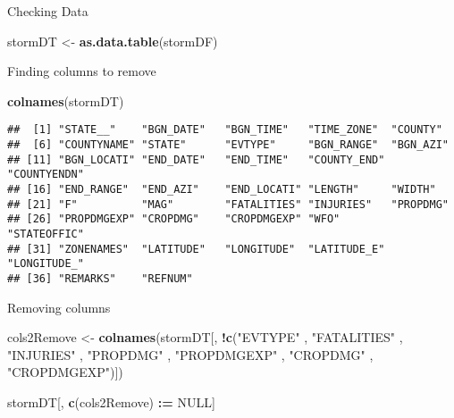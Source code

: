 \documentclass[]{article}
\newenvironment{Shaded}{\begin{snugshade}}{\end{snugshade}}
\newcommand{\ErrorTok}[1]{\textcolor[rgb]{0.64,0.00,0.00}{\textbf{#1}}}
\newcommand{\KeywordTok}[1]{\textcolor[rgb]{0.13,0.29,0.53}{\textbf{#1}}}
\newcommand{\NormalTok}[1]{#1}
\newcommand{\OperatorTok}[1]{\textcolor[rgb]{0.81,0.36,0.00}{\textbf{#1}}}
\newcommand{\OtherTok}[1]{\textcolor[rgb]{0.56,0.35,0.01}{#1}}
\newcommand{\StringTok}[1]{\textcolor[rgb]{0.31,0.60,0.02}{#1}}
\begin{document}
Checking Data

\begin{Shaded}
\begin{Highlighting}[]
\NormalTok{stormDT <-}\StringTok{ }\KeywordTok{as.data.table}\NormalTok{(stormDF)}
\end{Highlighting}
\end{Shaded}

Finding columns to remove

\begin{Shaded}
\begin{Highlighting}[]
\KeywordTok{colnames}\NormalTok{(stormDT)}
\end{Highlighting}
\end{Shaded}

\begin{verbatim}
##  [1] "STATE__"    "BGN_DATE"   "BGN_TIME"   "TIME_ZONE"  "COUNTY"    
##  [6] "COUNTYNAME" "STATE"      "EVTYPE"     "BGN_RANGE"  "BGN_AZI"   
## [11] "BGN_LOCATI" "END_DATE"   "END_TIME"   "COUNTY_END" "COUNTYENDN"
## [16] "END_RANGE"  "END_AZI"    "END_LOCATI" "LENGTH"     "WIDTH"     
## [21] "F"          "MAG"        "FATALITIES" "INJURIES"   "PROPDMG"   
## [26] "PROPDMGEXP" "CROPDMG"    "CROPDMGEXP" "WFO"        "STATEOFFIC"
## [31] "ZONENAMES"  "LATITUDE"   "LONGITUDE"  "LATITUDE_E" "LONGITUDE_"
## [36] "REMARKS"    "REFNUM"
\end{verbatim}

Removing columns

\begin{Shaded}
\begin{Highlighting}[]
\NormalTok{cols2Remove <-}\StringTok{ }\KeywordTok{colnames}\NormalTok{(stormDT[, }\OperatorTok{!}\KeywordTok{c}\NormalTok{(}\StringTok{"EVTYPE"}
\NormalTok{  , }\StringTok{"FATALITIES"}
\NormalTok{  , }\StringTok{"INJURIES"}
\NormalTok{  , }\StringTok{"PROPDMG"}
\NormalTok{  , }\StringTok{"PROPDMGEXP"}
\NormalTok{  , }\StringTok{"CROPDMG"}
\NormalTok{  , }\StringTok{"CROPDMGEXP"}\NormalTok{)])}
\end{Highlighting}
\end{Shaded}

\begin{Shaded}
\begin{Highlighting}[]
\NormalTok{stormDT[, }\KeywordTok{c}\NormalTok{(cols2Remove) }\OperatorTok{:}\ErrorTok{=}\StringTok{ }\OtherTok{NULL}\NormalTok{]}
\end{Highlighting}
\end{Shaded}
\end{document}
